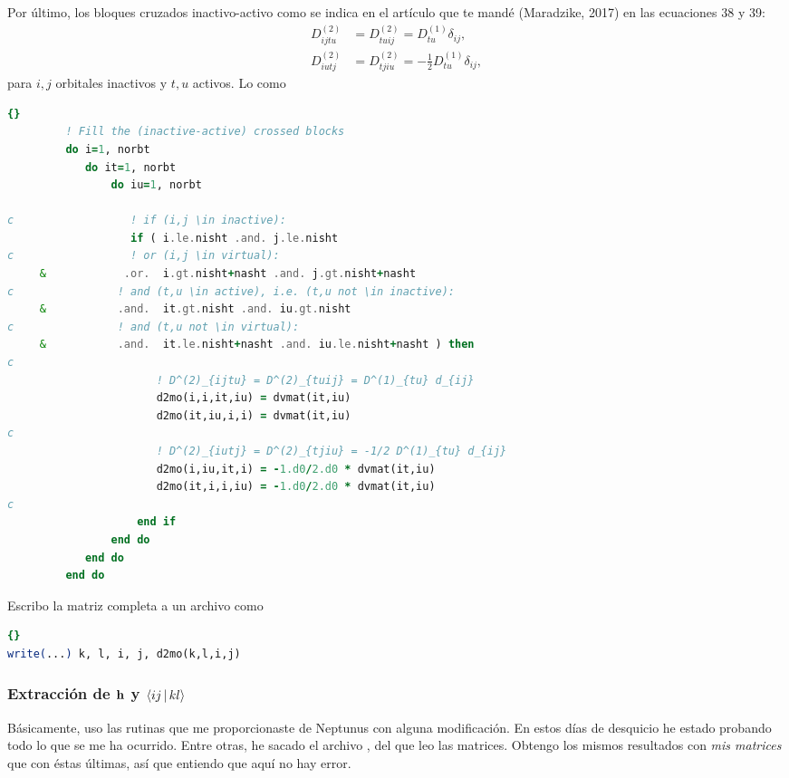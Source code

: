 Por último, los bloques cruzados inactivo-activo como se indica en el artículo
que te mandé (Maradzike, 2017) en las ecuaciones 38 y 39:
\begin{align}
    D^{(2)}_{ijtu} & = D^{(2)}_{tuij} = D^{(1)}_{tu} \delta_{ij} ,\\
    D^{(2)}_{iutj} & = D^{(2)}_{tjiu} = -\frac{1}{2} D^{(1)}_{tu} \delta_{ij} ,
\end{align}
para $i,j$ orbitales inactivos y $t,u$ activos.
Lo  como
\begin{lstlisting}[language=fortran]{}
         ! Fill the (inactive-active) crossed blocks
         do i=1, norbt
            do it=1, norbt
                do iu=1, norbt

c                  ! if (i,j \in inactive):
                   if ( i.le.nisht .and. j.le.nisht
c                  ! or (i,j \in virtual):
     &            .or.  i.gt.nisht+nasht .and. j.gt.nisht+nasht
c                ! and (t,u \in active), i.e. (t,u not \in inactive):
     &           .and.  it.gt.nisht .and. iu.gt.nisht
c                ! and (t,u not \in virtual):
     &           .and.  it.le.nisht+nasht .and. iu.le.nisht+nasht ) then
c
                       ! D^(2)_{ijtu} = D^(2)_{tuij} = D^(1)_{tu} d_{ij}
                       d2mo(i,i,it,iu) = dvmat(it,iu)
                       d2mo(it,iu,i,i) = dvmat(it,iu)
c
                       ! D^(2)_{iutj} = D^(2)_{tjiu} = -1/2 D^(1)_{tu} d_{ij}
                       d2mo(i,iu,it,i) = -1.d0/2.d0 * dvmat(it,iu)
                       d2mo(it,i,i,iu) = -1.d0/2.d0 * dvmat(it,iu)
c
                    end if
                end do
            end do
         end do
\end{lstlisting}
Escribo la matriz completa a un archivo como
\begin{lstlisting}[language=fortran]{}
write(...) k, l, i, j, d2mo(k,l,i,j)
\end{lstlisting}

\subsubsection{Extracción de $\boldsymbol{\mathrm{h}}$ y $ \Braket{ij | kl}$} %
Básicamente, uso las rutinas que me proporcionaste de Neptunus con alguna
modificación.
En estos días de desquicio he estado probando todo lo que se me ha ocurrido.
Entre otras, he sacado el archivo , del que leo las
matrices.
Obtengo los mismos resultados con \textit{mis matrices} que con éstas últimas,
así que entiendo que aquí no hay error.

